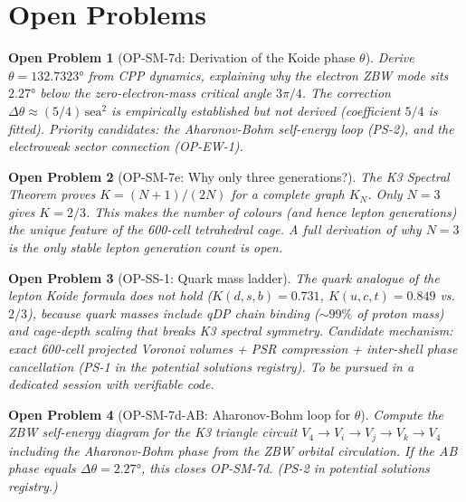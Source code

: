 \documentclass[11pt]{article}
\newtheorem{openproblem}{Open Problem}
\begin{document}
\section{Open Problems}

\begin{openproblem}[OP-SM-7d: Derivation of the Koide phase $\theta$]
\label{op:theta}
Derive $\theta = 132.7323°$ from CPP dynamics, explaining why the
electron ZBW mode sits $2.27°$ below the zero-electron-mass critical
angle $3\pi/4$.  The correction $\Delta\theta \approx (5/4)\,\mathrm{sea}^2$
is empirically established but not derived (coefficient $5/4$ is fitted).
Priority candidates: the Aharonov-Bohm self-energy loop (PS-2), and
the electroweak sector connection (OP-EW-1).
\end{openproblem}

\begin{openproblem}[OP-SM-7e: Why only three generations?]
The K3 Spectral Theorem proves $K = (N+1)/(2N)$ for a complete graph
$K_N$.  Only $N=3$ gives $K = 2/3$.  This makes the number of colours
(and hence lepton generations) the unique feature of the 600-cell
tetrahedral cage.  A full derivation of why $N = 3$ is the only stable
lepton generation count is open.
\end{openproblem}

\begin{openproblem}[OP-SS-1: Quark mass ladder]
\label{op:quarklad}
The quark analogue of the lepton Koide formula does not hold
($K(d,s,b) = 0.731$, $K(u,c,t) = 0.849$ vs.\ $2/3$), because quark
masses include qDP chain binding ($\sim 99\%$ of proton mass) and
cage-depth scaling that breaks K3 spectral symmetry.  Candidate
mechanism: exact 600-cell projected Voronoi volumes + PSR compression
+ inter-shell phase cancellation (PS-1 in the potential solutions
registry).  To be pursued in a dedicated session with verifiable code.
\end{openproblem}

\begin{openproblem}[OP-SM-7d-AB: Aharonov-Bohm loop for $\theta$]
Compute the ZBW self-energy diagram for the K3 triangle circuit
$V_4 \to V_i \to V_j \to V_k \to V_4$ including the Aharonov-Bohm
phase from the ZBW orbital circulation.  If the AB phase equals
$\Delta\theta = 2.27°$, this closes OP-SM-7d.  (PS-2 in potential
solutions registry.)
\end{openproblem}
\end{document}
